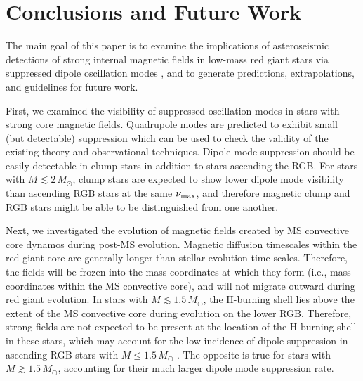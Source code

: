 \section{Conclusions and Future Work}
\label{conclusion}

The main goal of this paper is to examine the implications of asteroseismic detections of strong internal magnetic fields in low-mass red giant stars via suppressed dipole oscillation modes \citep{Fuller_2015,Stello_2016}, and to generate predictions, extrapolations, and guidelines for future work. 

First, we examined the visibility of suppressed oscillation modes in stars with strong core magnetic fields. Quadrupole modes are predicted to exhibit small (but detectable) suppression which can be used to check the validity of the existing theory and observational techniques. Dipole mode suppression should be easily detectable in clump stars in addition to stars ascending the RGB. For stars with $M \lesssim 2 \, M_\odot$, clump stars are expected to show lower dipole mode visibility than ascending RGB stars at the same $\nu_{\rm max}$, and therefore magnetic clump and RGB stars might be able to be distinguished from one another.

Next, we investigated the evolution of magnetic fields created by MS convective core dynamos during post-MS evolution. Magnetic diffusion timescales within the red giant core are generally longer than stellar evolution time scales. Therefore, the fields will be frozen into the mass coordinates at which they form (i.e., mass coordinates within the MS convective core), and will not migrate outward during red giant evolution. In stars with $M \lesssim 1.5 \, M_\odot$, the H-burning shell lies above the extent of the MS convective core during evolution on the lower RGB. Therefore, strong fields are not expected to be present at the location of the H-burning shell in these stars, which may account for the low incidence of dipole suppression in ascending RGB stars with $M \leq 1.5 \, M_\odot$ \cite{Stello_2016}. The opposite is true for stars with $M \gtrsim 1.5 \, M_\odot$, accounting for their much larger dipole mode suppression rate.

